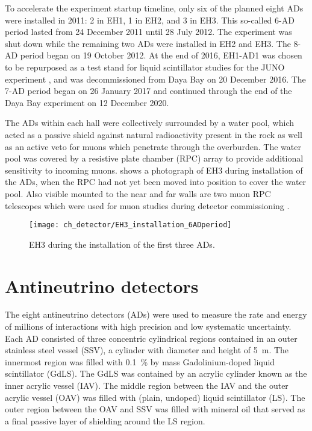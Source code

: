 To accelerate the experiment startup timeline,
only six of the planned eight ADs were installed in 2011:
2 in EH1, 1 in EH2, and 3 in EH3.
This so-called 6-AD period lasted from 24 December 2011 until 28 July 2012.
The experiment was shut down while the remaining two ADs were installed
in EH2 and EH3.
The 8-AD period began on 19 October 2012.
At the end of 2016, EH1-AD1 was chosen to be repurposed as a test stand
for liquid scintillator studies for the JUNO experiment \cite{junoproposal2016},
and was decommissioned from Daya Bay on 20 December 2016.
The 7-AD period began on 26 January 2017 and continued through the end of
the Daya Bay experiment on 12 December 2020.

The ADs within each hall were collectively surrounded by a water pool,
which acted as a passive shield against natural radioactivity present in the rock
as well as an active veto for muons which penetrate through the overburden.
The water pool was covered by a resistive plate chamber (RPC) array
to provide additional sensitivity to incoming muons.
 shows a photograph of EH3 during installation of the ADs,
when the RPC had not yet been moved into position to cover the water pool.
Also visible mounted to the near and far walls are two muon RPC telescopes
which were used for muon studies during detector commissioning \cite{muonsystem2015}.

\begin{figure}
    \centering
    \texttt{[image: ch\_detector/EH3\_installation\_6ADperiod]}
    \caption[View of EH3]{EH3 during the installation of the first three ADs.}
    \label{fig:eh3_wp_photo}
\end{figure}

\section{Antineutrino detectors}

The eight antineutrino detectors (ADs) were used to measure
the rate and energy of millions of \nuebar{} interactions with high precision
and low systematic uncertainty.
Each AD consisted of three concentric cylindrical regions
contained in an outer stainless steel vessel (SSV),
a cylinder with diameter and height of \SI{5}{\m}.
The innermost region was filled with \SI{0.1}{\percent} by mass
Gadolinium-doped liquid scintillator (GdLS).
The GdLS was contained by an acrylic cylinder known as the inner acrylic vessel (IAV).
The middle region between the IAV and the outer acrylic vessel (OAV) was filled
with (plain, undoped) liquid scintillator (LS).
The outer region between the OAV and SSV was filled with mineral oil
that served as a final passive layer of shielding around the LS region.

